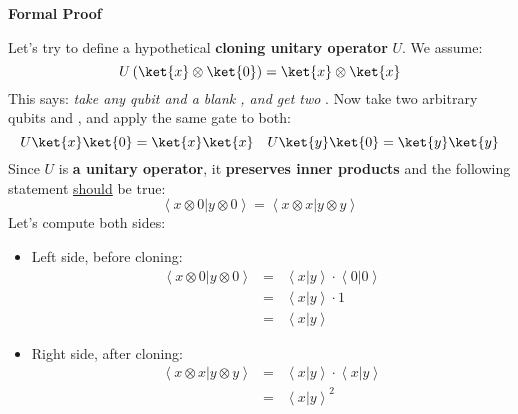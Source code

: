 \highspace
\begin{flushleft}
    \textcolor{Green3}{ \textbf{Formal Proof}}
\end{flushleft}
Let's try to define a hypothetical \textbf{cloning unitary operator} $U$. We assume:
\begin{equation*}
    U \left( \ket{x} \otimes \ket{0} \right) = \ket{x} \otimes \ket{x}
\end{equation*}
This says: \emph{take any qubit  and a blank , and get two }. Now take two arbitrary qubits  and , and apply the same gate to both:
\begin{equation*}
    U\ket{x}\ket{0} = \ket{x}\ket{x} \quad U\ket{y}\ket{0} = \ket{y}\ket{y}
\end{equation*}
Since $U$ is \textbf{a unitary operator}, it \textbf{preserves inner products} and the following statement \underline{should} be true:
\begin{equation*}
    \left\langle x \otimes 0 | y \otimes 0 \right\rangle = \left\langle x \otimes x | y \otimes y \right\rangle
\end{equation*}
Let's compute both sides:
\begin{itemize}
    \item Left side, before cloning:
    \begin{equation*}
        \begin{array}{rcl}
            \left\langle x \otimes 0 | y \otimes 0 \right\rangle &=& \left\langle x | y \right\rangle \cdot \left\langle 0 | 0 \right\rangle \\ [.5em]
            &=& \left\langle x | y \right\rangle \cdot 1 \\ [.5em]
            &=& \left\langle x | y \right\rangle
        \end{array}
    \end{equation*}

    \item Right side, after cloning:
    \begin{equation*}
        \begin{array}{rcl}
            \left\langle x \otimes x | y \otimes y \right\rangle &=& \left\langle x | y \right\rangle \cdot \left\langle x | y \right\rangle \\ [.5em]
            &=& \left\langle x | y \right\rangle^{2}
        \end{array}
    \end{equation*}
\end{itemize}
